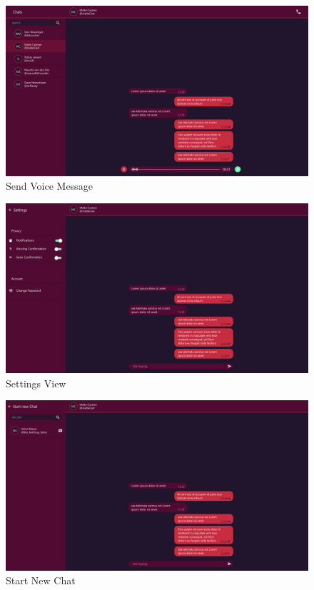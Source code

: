 \begin{figure}[h]
    \centering
    \includegraphics[width=1.0\textwidth]{./graphics/wireframes/SendVoiceMessage}
    \caption{Send Voice Message}
    \label{fig:figure27}
\end{figure}

\begin{figure}[h]
    \centering
    \includegraphics[width=1.0\textwidth]{./graphics/wireframes/SettingsView}
    \caption{Settings View}
    \label{fig:figure28}
\end{figure}

\begin{figure}[h]
    \centering
    \includegraphics[width=1.0\textwidth]{./graphics/wireframes/StartNewChat}
    \caption{Start New Chat}
    \label{fig:figure29}
\end{figure}

